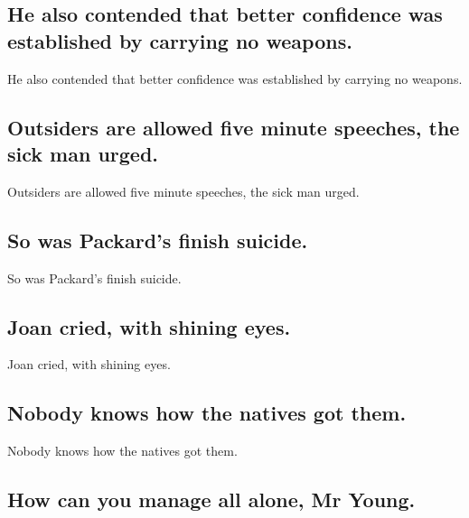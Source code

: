 \documentclass[]{article}
\begin{document}
\hypertarget{he-also-contended-that-better-confidence-was-established-by-carrying-no-weapons.}{%
\subsection{He also contended that better confidence was established by
carrying no
weapons.}\label{he-also-contended-that-better-confidence-was-established-by-carrying-no-weapons.}}

He also contended that better confidence was established by carrying no
weapons.

\hypertarget{outsiders-are-allowed-five-minute-speeches-the-sick-man-urged.}{%
\subsection{Outsiders are allowed five minute speeches, the sick man
urged.}\label{outsiders-are-allowed-five-minute-speeches-the-sick-man-urged.}}

Outsiders are allowed five minute speeches, the sick man urged.

\hypertarget{so-was-packards-finish-suicide.}{%
\subsection{So was Packard's finish
suicide.}\label{so-was-packards-finish-suicide.}}

So was Packard's finish suicide.

\hypertarget{joan-cried-with-shining-eyes.}{%
\subsection{Joan cried, with shining
eyes.}\label{joan-cried-with-shining-eyes.}}

Joan cried, with shining eyes.

\hypertarget{nobody-knows-how-the-natives-got-them.}{%
\subsection{Nobody knows how the natives got
them.}\label{nobody-knows-how-the-natives-got-them.}}

Nobody knows how the natives got them.

\hypertarget{how-can-you-manage-all-alone-mr-young.}{%
\subsection{How can you manage all alone, Mr
Young.}\label{how-can-you-manage-all-alone-mr-young.}}
\end{document}
